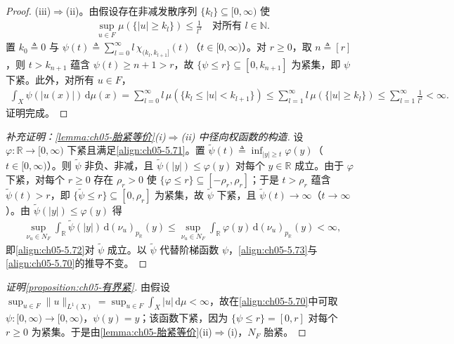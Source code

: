 \documentclass[../../main.tex]{subfiles}%
\begin{document}
\begin{proof}
(iii)$\Rightarrow$(ii)。由假设存在非减发散序列 $\{k_l\}\subseteq[0,\infty)$ 使
\begin{align*}
\sup_{u\in F}\mu(\{|u|\geqslant k_l\})\leqslant\frac{1}{l^3}\quad\text{对所有 }l\in\mathbb{N}.
\end{align*}
置 $k_0\triangleq0$ 与 $\psi(t)\triangleq\sum_{l=0}^\infty l\,\chi_{(k_l,k_{l+1}]}(t)$（$t\in[0,\infty)$）。对 $r\geqslant0$，取 $n\triangleq[r]$，则 $t>k_{n+1}$ 蕴含 $\psi(t)\geqslant n+1>r$，故 $\{\psi\leqslant r\}\subseteq[0,k_{n+1}]$ 为紧集，即 $\psi$ 下紧。此外，对所有 $u\in F$，
\begin{align*}
\int_X\psi(|u(x)|)\,\mathrm{d}\mu(x)
=\sum_{l=0}^\infty l\,\mu(\{k_l\leqslant|u|<k_{l+1}\})
\leqslant\sum_{l=1}^\infty l\,\mu(\{|u|\geqslant k_l\})
\leqslant\sum_{l=1}^\infty\frac{1}{l^2}<\infty.
\end{align*}
证明完成。
\end{proof}

\begin{proof}[补充证明：\cref{lemma:ch05-胎紧等价}(i)$\Rightarrow$(ii) 中径向权函数的构造]
设 $\varphi:\mathbb{R}\to[0,\infty)$ 下紧且满足\eqref{align:ch05-5.71}。置 $\tilde\psi(t)\triangleq\inf_{|y|\geqslant t}\varphi(y)$（$t\in[0,\infty)$）。则 $\tilde\psi$ 非负、非减，且 $\tilde\psi(|y|)\leqslant\varphi(y)$ 对每个 $y\in\mathbb{R}$ 成立。由于 $\varphi$ 下紧，对每个 $r\geqslant0$ 存在 $\rho_r>0$ 使 $\{\varphi\leqslant r\}\subseteq[-\rho_r,\rho_r]$；于是 $t>\rho_r$ 蕴含 $\tilde\psi(t)>r$，即 $\{\tilde\psi\leqslant r\}\subseteq[0,\rho_r]$ 为紧集，故 $\tilde\psi$ 下紧，且 $\tilde\psi(t)\to\infty$（$t\to\infty$）。由 $\tilde\psi(|y|)\leqslant\varphi(y)$ 得
\begin{align*}
\sup_{\nu_u\in N_F}\int_{\mathbb{R}}\tilde\psi(|y|)\,\mathrm{d}(\nu_u)_{p_{\mathbb{R}}}(y)
\leqslant\sup_{\nu_u\in N_F}\int_{\mathbb{R}}\varphi(y)\,\mathrm{d}(\nu_u)_{p_{\mathbb{R}}}(y)<\infty,
\end{align*}
即\eqref{align:ch05-5.72}对 $\tilde\psi$ 成立。以 $\tilde\psi$ 代替阶梯函数 $\psi$，\eqref{align:ch05-5.73}与\eqref{align:ch05-5.70}的推导不变。
\end{proof}

\begin{proof}[证明\cref{proposition:ch05-有界紧}]
由假设 $\sup_{u\in F}\|u\|_{L^1(X)}=\sup_{u\in F}\int_X|u|\,\mathrm{d}\mu<\infty$，故在\eqref{align:ch05-5.70}中可取 $\psi:[0,\infty)\to[0,\infty)$，$\psi(y)=y$；该函数下紧，因为 $\{\psi\leqslant r\}=[0,r]$ 对每个 $r\geqslant0$ 为紧集。于是由\cref{lemma:ch05-胎紧等价}(ii)$\Rightarrow$(i)，$N_F$ 胎紧。
\end{proof}
\end{document}

